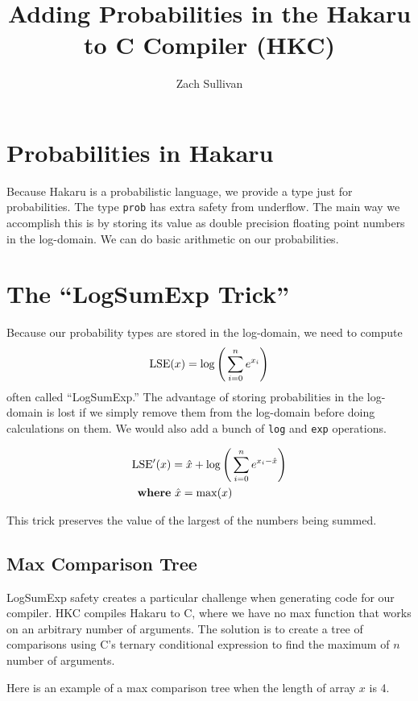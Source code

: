\documentclass{article}
\title{Adding Probabilities in the Hakaru to C Compiler (HKC)}
\author{Zach Sullivan}
\begin{document}
\maketitle

\section*{Probabilities in Hakaru}

Because Hakaru is a probabilistic language, we provide a type just for
probabilities. The type {\tt prob} has extra safety from underflow. The main way
we accomplish this is by storing its value as double precision floating point
numbers in the log-domain. We can do basic arithmetic on our probabilities.

\section*{The ``LogSumExp Trick''}
Because our probability types are stored in the log-domain, we need to compute
\begin{displaymath}
{\rm LSE}(x) = \log\Bigg(\sum_{i=0}^{n}{e^{x_i}}\Bigg)
\end{displaymath}
often called ``LogSumExp.'' The advantage of storing probabilities in the
log-domain is lost if we simply remove them from the log-domain before doing
calculations on them. We would also add a bunch of {\tt log} and {\tt exp}
operations.

\begin{align*}
{\rm LSE^\prime}(x) &= \hat x + \log\Bigg(\sum_{i=0}^{n}{e^{x_i-\hat x}}\Bigg)\\
{\rm\bf where}&\ \hat x = {\rm max}(x)
\end{align*}

This trick preserves the value of the largest of the numbers being summed.


\subsection*{Max Comparison Tree}
LogSumExp safety creates a particular challenge when generating code for our
compiler. HKC compiles Hakaru to C, where we have no max function that works
on an arbitrary number of arguments. The solution is to create a tree of
comparisons using C's ternary conditional expression to find the maximum of $n$
number of arguments.

Here is an example of a max comparison tree when the length of array $x$ is
4.
\end{document}
